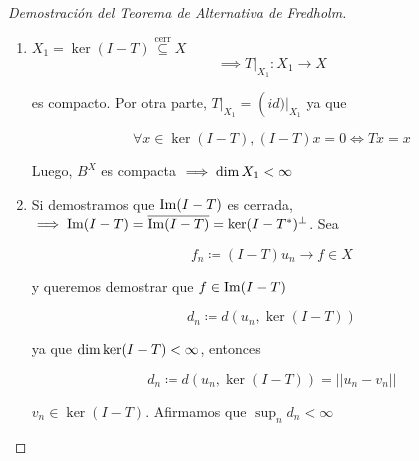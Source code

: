\begin{proof}[Demostración del Teorema de Alternativa de Fredholm]
   \begin{enumerate}[label=\alph*)]
      \item $X_1=\ker(I-T)\overset{\text{cerr}}{\subseteq} X$
      \[\implies T\big\rvert_{X_1}:X_1\to X\]

      es compacto. Por otra parte, $T\big\rvert_{X_1}=\operatorname(id)\big|_{X_1}$ ya que 

      \[\forall x\in \ker(I-T), (I-T)x=0\iff Tx=x\]

      Luego, $B^X$ es compacta $\implies \operatorname{dim} X_1<\infty$ 

      \item Si demostramos que $\operatorname{Im}(I-T)$ es cerrada, $\implies \operatorname{Im}(I-T)=\overline{\operatorname{Im}(I-T)}=\ker(I-T^*)^\perp$. Sea 
      
      \[f_n\coloneqq (I-T)u_n\to f\in X\]

      y queremos demostrar que $f\in \operatorname{Im}(I-T)$

      \[d_n\coloneqq d(u_n,\ker(I-T))\]

      ya que $\operatorname{dim}\ker(I-T)<\infty$, entonces 

      \[d_n\coloneqq d(u_n,\ker(I-T))=||u_n-v_n||\]

      $v_n\in \ker (I-T)$. Afirmamos que $\sup_n d_n<\infty$
   \end{enumerate}
\end{proof}